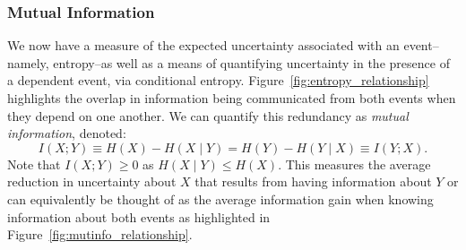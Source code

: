 \documentclass{article}\usepackage[]{graphicx}\usepackage[]{color}
\begin{document}
\subsubsection{Mutual Information}
\label{sec:mutual}
We now have a measure of the expected uncertainty associated with an event--namely, entropy--as well as a means of quantifying uncertainty in the presence of a dependent event, via conditional entropy. Figure~\ref{fig:entropy_relationship} highlights the overlap in information being communicated from both events when they depend on one another. We can quantify this redundancy as \textit{mutual information}, denoted:
$$I(X;Y) \equiv H(X) - H(X\mid Y) = H(Y) - H(Y\mid X) \equiv I(Y;X).$$
Note that $I(X;Y) \ge 0$ as $H(X\mid Y) \le H(X)$. This measures the average reduction in uncertainty about $X$ that results from having information about $Y$ or can equivalently be thought of as the average information gain when knowing information about both events as highlighted in Figure~\ref{fig:mutinfo_relationship}\cite{mackayInformationTheoryInference,walakiraDetectingGeneGene2022,huCharacterizingGeneticInteractions2011}.
\end{document}
